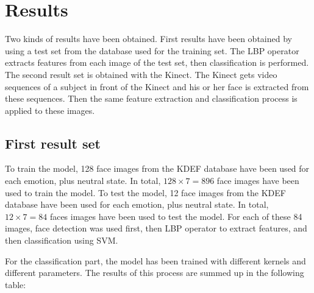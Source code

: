 \chapter{Results}
\label{chap:eval_results}

\noindent Two kinds of results have been obtained. First results have been obtained by using a test set from the database used for the training set. The LBP operator extracts features from each image of the test set, then classification is performed. The second result set is obtained with the Kinect. The Kinect gets video sequences of a subject in front of the Kinect and his or her face is extracted from these sequences. Then the same feature extraction and classification process is applied to these images.
\newline

\section{First result set}

\vspace{\baselineskip}
\noindent To train the model, 128 face images from the KDEF database have been used for each emotion, plus neutral state. In total, $ 128\times7 = 896 $ face images have been used to train the model. To test the model, 12 face images from the KDEF database have been used for each emotion, plus neutral state. In total, $ 12\times7 = 84 $ faces images have been used to test the model. For each of these 84 images, face detection was used first, then LBP operator to extract features, and then classification using SVM.
\newline

\noindent For the classification part, the model has been trained with different kernels and different parameters. The results of this process are summed up in the following table:
\newline

